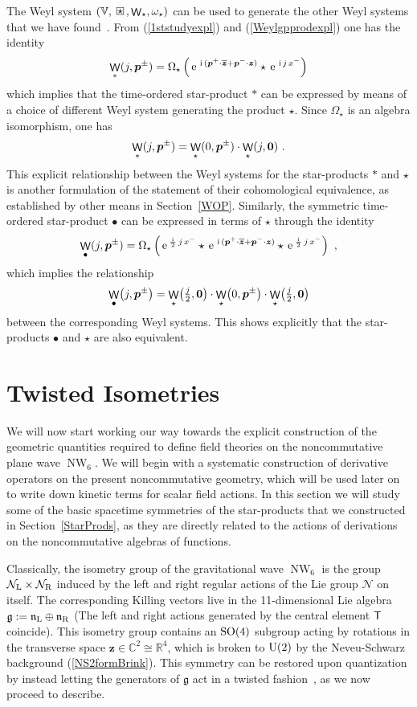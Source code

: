 \documentclass[11pt,a4paper]{article}
\DeclareMathOperator{\NW}{NW}
\DeclareMathOperator{\weyl}{{\sf W}}                   %
\newcommand{\compc}{\mkern+4mu\square\mkern-17.4mu{\mbox{
    \protect\raisebox{0.2ex}{$\star$}}\mkern+5mu}}      %
\newcommand{\1}{\mathbb{1}}
\newcommand{\mbf}[1]{{\boldsymbol {#1} }}
\def\ii{{\,{\rm i}\,}}
\def\T{{\sf T}}
\def\mz{{\mbf z}}
\def\mbp{{\mbf p}}
\def\mfn{{\mathfrak n}}
\def\mfg{{\mathfrak g}}
\def\mcN{{\mathcal N}}
\def\mbbV{{\mathbb V}}
\newcommand{\newsection}{\setcounter{equation}{0}\section}
\newcommand{\complex}{{\mathbb C}} %
\newcommand{\real}{{\mathbb R}} %
\def\e{{\,\rm e}\,}
\newcommand{\beq}{\begin{eqnarray}}
\newcommand{\eeq}{\end{eqnarray}}
\begin{document}
The Weyl system $(\mbbV,\compc,\weyl_\star,\omega_\star)$ can be used
to generate the other Weyl systems that we have
found~\cite{ALZ1}. From (\ref{1ststudyexpl}) and
(\ref{Weylgpprodexpl}) one has the identity
\beq
\weyl_*(j,\mbp^\pm)=\Omega_\star\left(
\e^{\ii(\mbf p^+\cdot\overline{\mz}
+\mbp^-\cdot\mz)}\star\e^{\ii j\, x^-}\right)
\label{weylTOWeylDelta}\eeq
which implies
that the time-ordered star-product $*$ can be expressed
by means of a choice of different Weyl system generating the product
$\star$. Since $\Omega_\star$ is an algebra isomorphism, one has
\beq
\weyl_*(j,\mbp^\pm)=\weyl_\star(0,\mbp^\pm)
\cdot\weyl_\star(j,\mbf0) \ .
\label{weylTOWeylprods}\eeq
This explicit relationship between the Weyl systems for the
star-products $*$ and $\star$ is another formulation of the statement
of their cohomological equivalence, as established by other means in
Section~\ref{WOP}. Similarly, the symmetric time-ordered star-product
$\bullet$ can be expressed in terms of $\star$ through the identity
\beq
\weyl_\bullet(j,\mbp^\pm)=\Omega_\star\left(
\e^{\frac\ii2\,j\,x^-}\star\e^{\ii(\mbp^+\cdot\overline{\mz}
+\mbp^-\cdot\mz)}\star\e^{\frac\ii2\,j\,x^-}\right) \ ,
\label{WeylTOsymWeylDelta}\eeq
which implies the relationship
\beq
\weyl_\bullet\bigl(j,\mbp^\pm\bigr)=\weyl_\star
\bigl(\mbox{$\frac j2$}
,\mbf0\bigr)\cdot\weyl_\star\bigl(0,\mbp^\pm\bigr)
\cdot\weyl_\star\bigl(\mbox{$\frac j2$},\mbf0\bigr)
\label{WeylTOsymWeylprods}\eeq
between the corresponding Weyl systems. This shows explicitly that the
star-products $\bullet$ and $\star$ are also equivalent.

\newsection{Twisted Isometries\label{Coprod}}

We will now start working our way towards the explicit construction of
the geometric quantities required to define field
theories on the noncommutative plane wave $\NW_6$. We will begin with
a systematic construction of derivative operators on the present
noncommutative geometry, which will be used later on to write down
kinetic terms for scalar field actions. In this section we will study
some of the basic spacetime symmetries of the star-products that we
constructed in Section~\ref{StarProds}, as they are directly related
to the actions of derivations on the noncommutative algebras of
functions.

Classically, the isometry group of the gravitational wave $\NW_6$ is
the group $\mcN_{\rm L}\times\mcN_{\rm R}$ induced by the left and right
regular actions of the Lie group $\mcN$ on itself. The corresponding
Killing vectors live in the 11-dimensional Lie algebra $\mfg:=\mfn_{\rm
  L}\oplus\mfn_{\rm R}$ (The left and right actions generated by the
central element $\T$ coincide). This isometry group contains an ${\rm
  SO}(4)$ subgroup acting by rotations in the transverse space
$\mz\in\complex^2\cong\real^4$, which is broken to ${\rm U}(2)$ by the
Neveu-Schwarz background (\ref{NS2formBrink}). This symmetry can be
restored upon quantization by instead letting the generators of $\mfg$
act in a twisted fashion~\cite{CPT1,CKNT1,Wess1}, as we now proceed to
describe.
\end{document}
